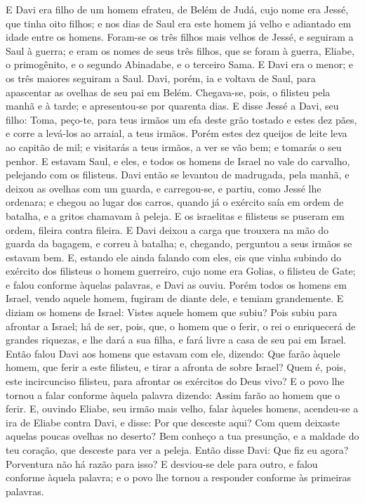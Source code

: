 E Davi era filho de um homem efrateu, de Belém de Judá, cujo nome
era Jessé, que tinha oito filhos; e nos dias de Saul era este homem
já velho e adiantado em idade entre os homens. Foram-se os
três filhos mais velhos de Jessé, e seguiram a Saul à guerra; e eram
os nomes de seus três filhos, que se foram à guerra, Eliabe, o
primogênito, e o segundo Abinadabe, e o terceiro Sama. E Davi
era o menor; e os três maiores seguiram a Saul. Davi, porém,
ia e voltava de Saul, para apascentar as ovelhas de seu pai em
Belém. Chegava-se, pois, o filisteu pela manhã e à tarde; e
apresentou-se por quarenta dias. E disse Jessé a Davi, seu
filho: Toma, peço-te, para teus irmãos um efa deste grão tostado e
estes dez pães, e corre a levá-los ao arraial, a teus irmãos.
Porém estes dez queijos de leite leva ao capitão de mil; e
visitarás a teus irmãos, a ver se vão bem; e tomarás o seu penhor.
E estavam Saul, e eles, e todos os homens de Israel no vale
do carvalho, pelejando com os filisteus. Davi então se
levantou de madrugada, pela manhã, e deixou as ovelhas com um
guarda, e carregou-se, e partiu, como Jessé lhe ordenara; e chegou
ao lugar dos carros, quando já o exército saía em ordem de batalha,
e a gritos chamavam à peleja. E os israelitas e filisteus se
puseram em ordem, fileira contra fileira. E Davi deixou a
carga que trouxera na mão do guarda da bagagem, e correu à batalha;
e, chegando, perguntou a seus irmãos se estavam bem. E,
estando ele ainda falando com eles, eis que vinha subindo do
exército dos filisteus o homem guerreiro, cujo nome era Golias, o
filisteu de Gate; e falou conforme àquelas palavras, e Davi as
ouviu. Porém todos os homens em Israel, vendo aquele homem,
fugiram de diante dele, e temiam grandemente. E diziam os
homens de Israel: Vistes aquele homem que subiu? Pois subiu para
afrontar a Israel; há de ser, pois, que, o homem que o ferir, o rei
o enriquecerá de grandes riquezas, e lhe dará a sua filha, e fará
livre a casa de seu pai em Israel. Então falou Davi aos
homens que estavam com ele, dizendo: Que farão àquele homem, que
ferir a este filisteu, e tirar a afronta de sobre Israel? Quem é,
pois, este incircunciso filisteu, para afrontar os exércitos do Deus
vivo? E o povo lhe tornou a falar conforme àquela palavra
dizendo: Assim farão ao homem que o ferir. E, ouvindo Eliabe,
seu irmão mais velho, falar àqueles homens, acendeu-se a ira de
Eliabe contra Davi, e disse: Por que desceste aqui? Com quem
deixaste aquelas poucas ovelhas no deserto? Bem conheço a tua
presunção, e a maldade do teu coração, que desceste para ver a
peleja. Então disse Davi: Que fiz eu agora? Porventura não há
razão para isso? E desviou-se dele para outro, e falou
conforme àquela palavra; e o povo lhe tornou a responder conforme às
primeiras palavras.

